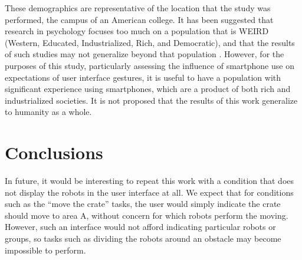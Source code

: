 \documentclass[]{article}
\begin{document}
These demographics are representative of the location that the study was performed, the campus of an American college. 
It has been suggested that research in psychology focuses too much on a population that is WEIRD (Western, Educated, Industrialized, Rich, and Democratic), and that the results of such studies may not generalize beyond that population \cite{arnett2008neglected}.
However, for the purposes of this study, particularly assessing the influence of smartphone use on expectations of user interface gestures, it is useful to have a population with significant experience using smartphones, which are a product of both rich and industrialized societies. 
It is not proposed that the results of this work generalize to humanity as a whole.  

\section{Conclusions}

In future, it would be interesting to repeat this work with a condition that does not display the robots in the user interface at all. 
We expect that for conditions such as the ``move the crate'' tasks, the user would simply indicate the crate should move to area A, without concern for which robots perform the moving. 
However, such an interface would not afford indicating particular robots or groups, so tasks such as dividing the robots around an obstacle may become impossible to perform. 



\end{document}
